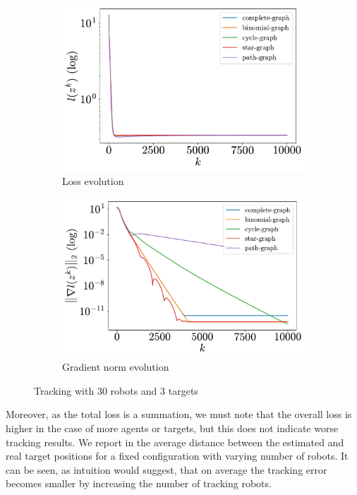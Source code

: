 \documentclass[a4paper,11pt,oneside]{book}
\begin{document}
\begin{figure}[H]
      \centering
      \begin{subfigure}[t]{0.46\linewidth}
            \centering
            \includegraphics[width=\linewidth]{./figs/tracking/30_3_2/loss.pdf} 
            \caption{Loss evolution}
      \end{subfigure}
      \hfill
      \begin{subfigure}[t]{0.46\linewidth}
            \centering
            \includegraphics[width=\linewidth]{./figs/tracking/30_3_2/gradient.pdf} 
            \caption{Gradient norm evolution}
      \end{subfigure}
      \caption{Tracking with $30$ robots and $3$ targets}
      \label{fig:tracking_30_3}
\end{figure}

Moreover, as the total loss is a summation, we must note that the overall loss is higher in the case of more agents or targets, but this does not indicate worse tracking results. We report in  the average distance between the estimated and real target positions for a fixed configuration with varying number of robots. It can be seen, as intuition would suggest, that on average the tracking error becomes smaller by increasing the number of tracking robots.
\end{document}
